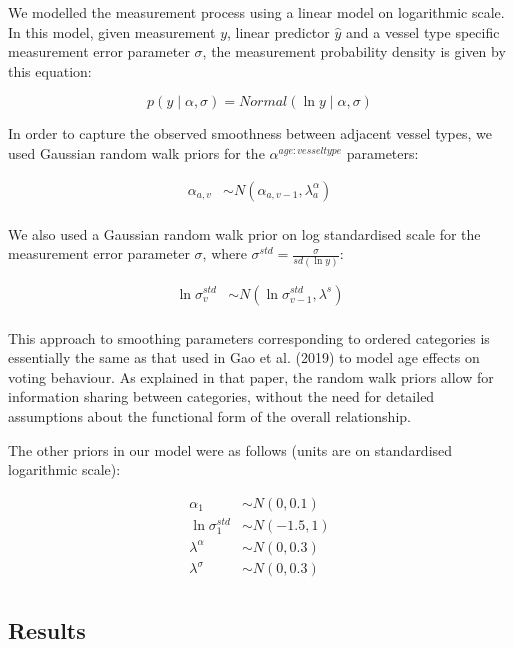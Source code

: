 \documentclass[
  letterpaper,
  DIV=11,
  numbers=noendperiod,
  oneside]{scrartcl}
\theoremstyle{plain}
\theoremstyle{remark}
\begin{document}
We modelled the measurement process using a linear model on logarithmic
scale. In this model, given measurement \(y\), linear predictor
\(\hat{y}\) and a vessel type specific measurement error parameter
\(\sigma\), the measurement probability density is given by this
equation:

\begin{equation}
  p(y\mid\alpha, \sigma) = Normal(\ln{y}\mid \alpha, \sigma) \label{eq:measurement-model-density}
\end{equation}

In order to capture the observed smoothness between adjacent vessel
types, we used Gaussian random walk priors for the
\(\alpha^{age:vesseltype}\) parameters:

\begin{align}
  \alpha_{a,v} &\sim N(\alpha_{a,v-1}, \lambda^{\alpha}_a)\label{eq:smooth} \\
\end{align}

We also used a Gaussian random walk prior on log standardised scale for
the measurement error parameter \(\sigma\), where
\(\sigma^{std}=\frac{\sigma}{sd(\ln
y)}\):

\begin{align}
  \ln\sigma^{std}_{v} &\sim N(\ln\sigma^{std}_{v-1}, \lambda^s)\label{eq:smooth-sigma} \\
\end{align}

This approach to smoothing parameters corresponding to ordered
categories is essentially the same as that used in Gao et al. (2019) to
model age effects on voting behaviour. As explained in that paper, the
random walk priors allow for information sharing between categories,
without the need for detailed assumptions about the functional form of
the overall relationship.

The other priors in our model were as follows (units are on standardised
logarithmic scale):

\begin{align}
  \alpha_{1} &\sim N(0, 0.1) \label{eq:density-other-priors} \\
  \ln\sigma^{std}_{1} &\sim N(-1.5, 1) \nonumber \\
  \lambda^{\alpha} &\sim N(0, 0.3) \nonumber \\
  \lambda^{\sigma} &\sim N(0, 0.3) \nonumber \\
\end{align}

\subsection{Results}\label{results-4}
\end{document}
